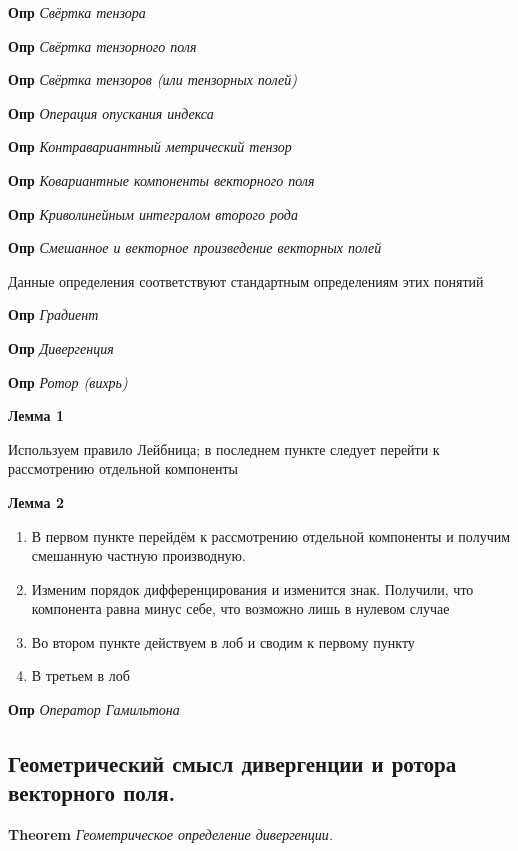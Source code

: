 \documentclass[a4paper, 14pt]{article}
\begin{document}
    \textbf{Опр} \textit{Свёртка тензора}
    
    \textbf{Опр} \textit{Свёртка тензорного поля}
    
    \textbf{Опр} \textit{Свёртка тензоров (или тензорных полей)}
    
    \textbf{Опр} \textit{Операция опускания индекса}
    
    \textbf{Опр} \textit{Контравариантный метрический тензор}
    
    \textbf{Опр} \textit{Ковариантные компоненты векторного поля}
    
    \textbf{Опр} \textit{Криволинейным интегралом второго рода}
    
    \textbf{Опр} \textit{Смешанное и векторное произведение векторных полей}
    
    Данные определения соответствуют стандартным определениям этих понятий
    
    \textbf{Опр} \textit{Градиент}
    
    \textbf{Опр} \textit{Дивергенция}
    
    \textbf{Опр} \textit{Ротор (вихрь)}
    
    \textbf{Лемма 1}
    
    Используем правило Лейбница; в последнем пункте следует перейти к рассмотрению отдельной компоненты
    
    \textbf{Лемма 2}
    
    \begin{enumerate}
        \item В первом пункте перейдём к рассмотрению отдельной компоненты и получим смешанную частную производную.
        \item Изменим порядок дифференцирования и изменится знак.
        Получили, что компонента равна минус себе, что возможно лишь в нулевом случае
        \item Во втором пункте действуем в лоб и сводим к первому пункту
        \item В третьем в лоб
    \end{enumerate}
    
    \textbf{Опр} \textit{Оператор Гамильтона}
    
    \subsection{Геометрический смысл дивергенции и ротора векторного поля.}
    
    \textbf{Theorem} \textit{Геометрическое определение дивергенции.}
    
\end{document}
